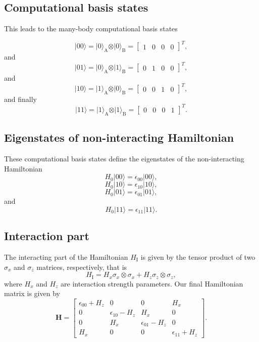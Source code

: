 \documentclass[%
oneside,                 %
final,                   %
10pt]{article}
\begin{document}
\subsection{Computational basis states}

This leads to the many-body computational basis states

\[
\vert 00\rangle = \vert 0\rangle_{\mathrm{A}}\otimes \vert 0\rangle_{\mathrm{B}}=\begin{bmatrix} 1 & 0 & 0 &0\end{bmatrix}^T,
\]
and
\[
\vert 01\rangle = \vert 0\rangle_{\mathrm{A}}\otimes \vert 1\rangle_{\mathrm{B}}=\begin{bmatrix} 0 & 1 & 0 &0\end{bmatrix}^T,
\]
and
\[
\vert 10\rangle = \vert 1\rangle_{\mathrm{A}}\otimes \vert 0\rangle_{\mathrm{B}}=\begin{bmatrix} 0 & 0 & 1 &0\end{bmatrix}^T,
\]
and finally
\[
\vert 11\rangle = \vert 1\rangle_{\mathrm{A}}\otimes \vert 1\rangle_{\mathrm{B}}=\begin{bmatrix} 0 & 0 & 0 &1\end{bmatrix}^T.
\]

\subsection{Eigenstates of non-interacting Hamiltonian}

These computational basis states define the eigenstates of the non-interacting  Hamiltonian
\[
H_0\vert 00 \rangle = \epsilon_{00}\vert 00 \rangle,
\]
\[
H_0\vert 10 \rangle = \epsilon_{10}\vert 10 \rangle,
\]
\[
H_0\vert 01 \rangle = \epsilon_{01}\vert 01 \rangle,
\]
and
\[
H_0\vert 11 \rangle = \epsilon_{11}\vert 11 \rangle.
\]

\subsection{Interaction part}

The interacting part of the Hamiltonian $H_{\mathrm{I}}$ is given by the tensor product of two $\sigma_x$ and $\sigma_z$  matrices, respectively, that is
\[
H_{\mathrm{I}}=H_x\sigma_x\otimes\sigma_x+H_z\sigma_z\otimes\sigma_z,
\]
where $H_x$ and $H_z$ are interaction strength parameters. Our final Hamiltonian matrix is given by
\[
\bm{H}=\begin{bmatrix} \epsilon_{00}+H_z & 0 & 0 & H_x \\
                       0  & \epsilon_{10}-H_z & H_x & 0 \\
		       0 & H_x & \epsilon_{01}-H_z & 0 \\
		       H_x & 0 & 0 & \epsilon_{11} +H_z \end{bmatrix}.
\] 
\end{document}
